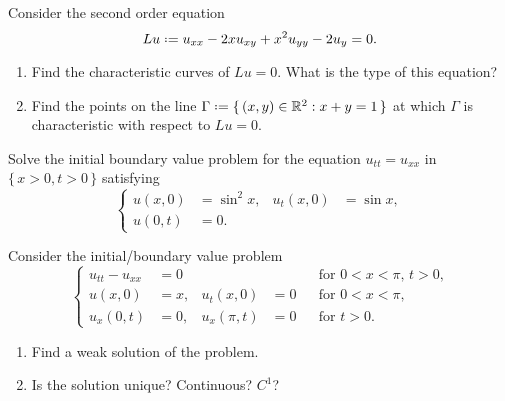 \begin{problem}
  Consider the second order equation
  \[
    Lu\defeq u_{xx}-2xu_{xy}+x^2u_{yy}-2u_y=0.
  \]
  \begin{enumerate}[label=(\alph*),noitemsep]
  \item Find the characteristic curves of \(Lu=0\). What is the type of
    this equation?
  \item Find the points on the line
    \(\Gamma\defeq\{\,(x,y)\in\bbR^2:x+y=1\,\}\) at which \(\Gamma\) is
    characteristic with respect to \(Lu=0\).
  \end{enumerate}
\end{problem}
\begin{solution*}
\end{solution*}

\begin{problem}
  Solve the initial boundary value problem for the equation
  \(u_{tt}=u_{xx}\) in \(\{\,x>0,t>0\,\}\) satisfying
    \[
     \left\{
       \begin{aligned}
         u(x,0)&=\sin^2x,&u_t(x,0)&=\sin x,\\
         u(0,t)&=0.
      \end{aligned}
    \right.
  \]
\end{problem}
\begin{solution*}
\end{solution*}

\begin{problem}
  Consider the initial/boundary value problem
    \[
     \left\{
       \begin{aligned}
         u_{tt}-u_{xx}&=0&&&&\text{for \(0<x<\pi\), \(t>0\),}\\
         u(x,0)&=x,&u_t(x,0)&=0&&\text{for \(0<x<\pi\),}\\
         u_x(0,t)&=0,&u_x(\pi,t)&=0&&\text{for \(t>0\).}
      \end{aligned}
    \right.
  \]
  \begin{enumerate}[label=(\alph*),noitemsep]
  \item Find a weak solution of the problem.
  \item Is the solution unique? Continuous? \(C^1\)?
  \end{enumerate}
\end{problem}
\begin{solution*}
\end{solution*}


